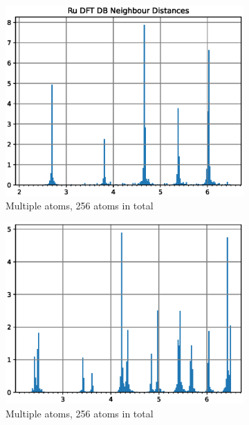 \begin{figure}
\begin{subfigure}{.32\textwidth}
  \centering
  \includegraphics[width=.94\linewidth]{chapters/potentials_fe_pd_ru/neighbour_distances/db_ru_neighbours.eps}  
  \caption{Multiple atoms, 256 atoms in total}
  \label{fig:sub-first}
\end{subfigure}
\begin{subfigure}{.32\textwidth}
  \centering
  \includegraphics[width=.94\linewidth]{chapters/potentials_fe_pd_ru/neighbour_distances/db_fepd_neighbours.eps}  
  \caption{Multiple atoms, 256 atoms in total}
  \label{fig:sub-first}
\end{subfigure}
\begin{subfigure}{.32\textwidth}
  \centering

\end{subfigure}
\end{figure}
